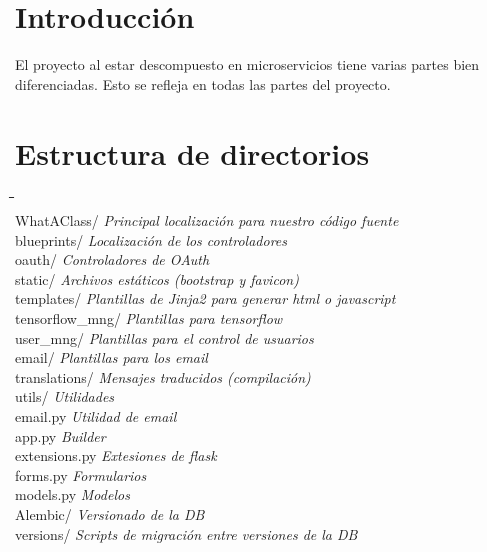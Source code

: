 
\section{Introducción}

El proyecto al estar descompuesto en microservicios tiene varias partes bien diferenciadas. Esto se refleja en todas las partes del proyecto. 

\section{Estructura de directorios}

\begin{tabbing}
\hphantom{tab }\= \hphantom{tab }\= \hphantom{tab }\= \hphantom{tab }\= \hphantom{quadruple tabula}\= \kill\\
WhatAClass/ \> \> \> \> \> \textit{Principal localización para nuestro código fuente}\\
\> blueprints/ \> \> \> \> \textit{Localización de los controladores}\\
\> \> oauth/ \> \> \> \textit{Controladores de OAuth}\\
\> static/ \> \> \> \> \textit{Archivos estáticos (bootstrap y favicon)}\\
\> templates/ \> \> \> \> \textit{Plantillas de Jinja2 para generar html o javascript}\\
\> \> tensorflow\_mng/ \> \> \> \textit{Plantillas para tensorflow}\\
\> \> user\_mng/\> \> \> \textit{Plantillas para el control de usuarios}\\
\> \> \> email/ \> \> \textit{Plantillas para los email}\\
\> translations/ \> \> \> \> \textit{Mensajes traducidos (compilación)} \\
\> utils/ \> \> \> \> \textit{Utilidades} \\
\> \> email.py \> \> \> \textit{Utilidad de email}\\
\> app.py \> \> \> \> \textit{Builder}\\
\> extensions.py \> \> \> \> \textit{Extesiones de flask}\\
\> forms.py \> \> \> \> \textit{Formularios}\\
\> models.py \> \> \> \> \textit{Modelos}\\
Alembic/ \> \> \> \> \> \textit{Versionado de la DB}\\
\> versions/ \> \> \> \> \textit{Scripts de migración entre versiones de la DB}\\

\end{tabbing}
